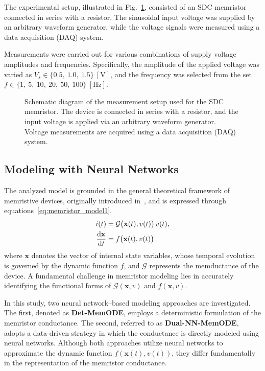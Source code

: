 \documentclass[lettersize,journal]{IEEEtran}
\newcommand{\der}{{\rm d}}
\newcommand{\G}{\mathcal{G}}
\newcommand{\ua}{v}
\newcommand{\ia}{i}
\begin{document}
The experimental setup, illustrated in Fig.~\ref{fig:memristor_setup}, consisted of an SDC memristor connected in series with a resistor. The sinusoidal input voltage was supplied by an arbitrary waveform generator, while the voltage signals were measured using a data acquisition (DAQ) system.

Measurements were carried out for various combinations of supply voltage amplitudes and frequencies. Specifically, the amplitude of the applied voltage was varied as \(V_s \in \{0.5,\ 1.0,\ 1.5\}~\mathrm{[V]}\), and the frequency was selected from the set \(f \in \{1,\ 5,\ 10,\ 20,\ 50,\ 100\}~\mathrm{[Hz]}\).

\begin{figure}[!t]
  \centering
  \resizebox{2.5in}{!}{}
  \vspace{-0.5in}
  \caption{Schematic diagram of the measurement setup used for the SDC memristor. The device is connected in series with a resistor, and the input voltage is applied via an arbitrary waveform generator. Voltage measurements are acquired using a data acquisition (DAQ) system.}
  \label{fig:memristor_setup}
\end{figure}

\subsection{Modeling with Neural Networks}
\noindent The analyzed model is grounded in the general theoretical framework of memristive devices, originally introduced in~\cite{Chua1976}, and is expressed through equations~\eqref{eq:memristor_model1}.
\newcommand{\xvec}{\mathbf{x}}
\begin{align}
  \begin{split}
    \label{eq:memristor_model1}
    \ia(t)                    & = \G \big(\xvec(t),\ua(t)\big) \, \ua(t), \\
    \frac{\der \xvec}{\der t} & = f\big(\xvec(t),\ua(t)\big)
  \end{split}
\end{align}
where \(\xvec\) denotes the vector of internal state variables, whose temporal evolution is governed by the dynamic function \(f\), and \(\G\) represents the memductance of the device. A fundamental challenge in memristor modeling lies in accurately identifying the functional forms of \(\G(\xvec,\ua)\) and \(f(\xvec,\ua)\).

In this study, two neural network–based modeling approaches are investigated. The first, denoted as \textbf{Det-MemODE}, employs a deterministic formulation of the memristor conductance. The second, referred to as \textbf{Dual-NN-MemODE}, adopts a data-driven strategy in which the conductance is directly modeled using neural networks. Although both approaches utilize neural networks to approximate the dynamic function \(f(\xvec(t), \ua(t))\), they differ fundamentally in the representation of the memristor conductance.
\end{document}

